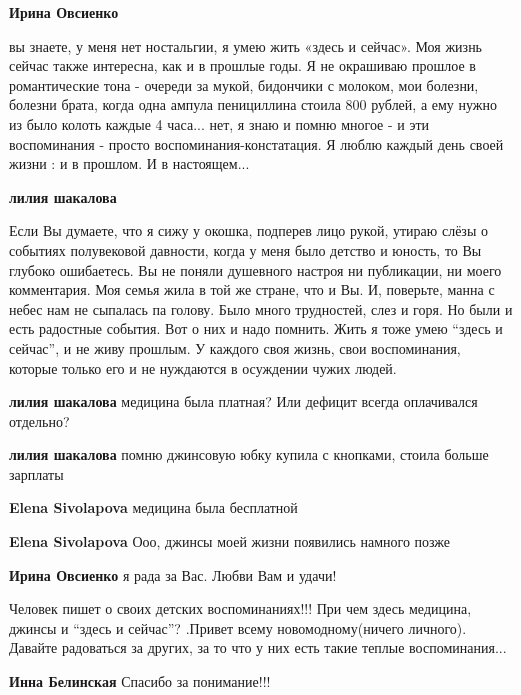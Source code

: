 \begin{itemize}
\begin{itemize} %
\textbf{Ирина Овсиенко} 

вы знаете, у меня нет ностальгии, я умею жить «здесь и сейчас». Моя жизнь
сейчас также интересна, как и в прошлые годы. Я не окрашиваю прошлое в
романтические тона - очереди за мукой, бидончики с молоком, мои болезни,
болезни брата, когда одна ампула пенициллина стоила 800 рублей, а ему нужно из
было колоть каждые 4 часа... нет, я знаю и помню многое - и эти воспоминания -
просто воспоминания-констатация. Я люблю каждый день своей жизни : и в прошлом.
И в настоящем...

\begin{itemize} %
\textbf{лилия шакалова} 

Если Вы думаете, что я сижу у окошка, подперев лицо рукой, утираю слёзы о
событиях полувековой давности, когда у меня было детство и юность, то Вы
глубоко ошибаетесь. Вы не поняли душевного настроя ни публикации, ни моего
комментария. Моя семья жила в той же стране, что и Вы. И, поверьте, манна с
небес нам не сыпалась па голову. Было много трудностей, слез и горя. Но были и
есть радостные события. Вот о них и надо помнить. Жить я тоже умею \enquote{здесь и
сейчас}, и не живу прошлым. У каждого своя жизнь, свои воспоминания, которые
только его и не нуждаются в осуждении чужих людей.


\textbf{лилия шакалова} медицина была платная? Или дефицит всегда оплачивался отдельно?

\textbf{лилия шакалова} помню джинсовую юбку купила с кнопками, стоила больше зарплаты

\textbf{Elena Sivolapova} медицина была бесплатной

\textbf{Elena Sivolapova} Ооо, джинсы моей жизни появились намного позже

\textbf{Ирина Овсиенко} я рада за Вас. Любви Вам и удачи!


Человек пишет о своих детских воспоминаниях!!! При чем здесь медицина, джинсы и
\enquote{здесь и сейчас}? .Привет всему новомодному(ничего личного). Давайте радоваться
за других, за то что у них есть такие теплые воспоминания...


\textbf{Инна Белинская} Спасибо за понимание!!!
\end{itemize} %


\end{itemize}
\end{itemize}
